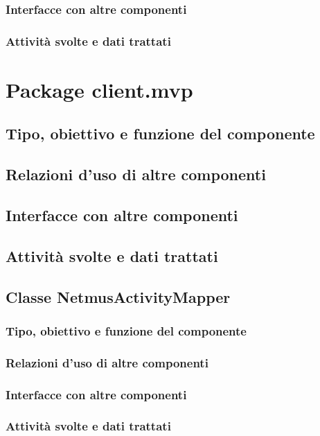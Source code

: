 \subsubsection*{Interfacce con altre componenti}
\subsubsection*{Attivit\`a svolte e dati trattati}

\newpage
\section{Package client.mvp} %
\subsection*{Tipo, obiettivo e funzione del componente}
\subsection*{Relazioni d'uso di altre componenti}
\subsection*{Interfacce con altre componenti}
\subsection*{Attivit\`a svolte e dati trattati}

\subsection{Classe NetmusActivityMapper}
\subsubsection*{Tipo, obiettivo e funzione del componente}
\subsubsection*{Relazioni d'uso di altre componenti}
\subsubsection*{Interfacce con altre componenti}
\subsubsection*{Attivit\`a svolte e dati trattati}

